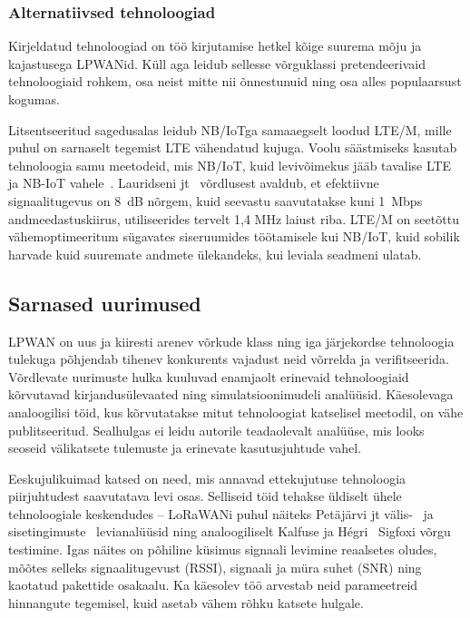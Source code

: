\documentclass[12pt]{article}
\newcommand{\TODO}{\todo[inline]}
\begin{document}
    \subsubsection{Alternatiivsed tehnoloogiad}

    Kirjeldatud tehnoloogiad on töö kirjutamise hetkel kõige suurema mõju ja kajastusega LPWANid.
    Küll aga leidub sellesse võrguklassi pretendeerivaid tehnoloogiaid rohkem, osa neist mitte nii õnnestunuid ning osa alles populaarsust kogumas.

    Litsentseeritud sagedusalas leidub NB\-/IoTga samaaegselt loodud LTE\-/M, mille puhul on sarnaselt tegemist LTE vähendatud kujuga.
    Voolu säästmiseks kasutab tehnoloogia samu meetodeid, mis NB\-/IoT, kuid levivõimekus jääb tavalise LTE ja NB-IoT vahele~\cite{benhiba2018comparative}.
    Lauridseni jt~\cite{lauridsen2016coverage} võrdlusest avaldub, et efektiivne signaalitugevus on 8~dB nõrgem, kuid seevastu saavutatakse kuni 1~Mbps andmeedastuskiirus, utiliseerides tervelt 1,4 MHz laiust riba.
    LTE\-/M on seetõttu vähemoptimeeritum sügavates siseruumides töötamisele kui NB\-/IoT, kuid sobilik harvade kuid suuremate andmete ülekandeks, kui leviala seadmeni ulatab.

    \TODO{Litsentseerimata sagedusalas\ldots}

    \subsection{Sarnased uurimused}
    LPWAN on uus ja kiiresti arenev võrkude klass ning iga järjekordse tehnoloogia tulekuga põhjendab tihenev konkurents vajadust neid võrrelda ja verifitseerida.
    Võrdlevate uurimuste hulka kuuluvad enamjaolt erinevaid tehnoloogiaid kõrvutavad kirjandusülevaated ning simulatsioonimudeli analüüsid.
    Käesolevaga analoogilisi töid, kus kõrvutatakse mitut tehnoloogiat katselisel meetodil, on vähe publitseeritud.
    Sealhulgas ei leidu autorile teadaolevalt analüüse, mis looks seoseid välikatsete tulemuste ja erinevate kasutusjuhtude vahel.

    Eeskujulikuimad katsed on need, mis annavad ettekujutuse tehnoloogia piirjuhtudest saavutatava levi osas.
    Selliseid töid tehakse üldiselt ühele tehnoloogiale keskendudes -- LoRaWANi puhul näiteks Petäjärvi jt välis-~\cite{petajajarvi2015coverage} ja sisetingimuste~\cite{petajajarvi} levianalüüsid ning analoogiliselt Kalfuse ja Hégri~\cite{kalfus2016ultra} Sigfoxi võrgu testimine.
    Igas näites on põhiline küsimus signaali levimine reaalsetes oludes, mõõtes selleks signaalitugevust (RSSI), signaali ja müra suhet (SNR) ning kaotatud pakettide osakaalu.
    Ka käesolev töö arvestab neid parameetreid hinnangute tegemisel, kuid asetab vähem rõhku katsete hulgale.
\end{document}
